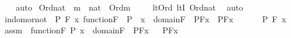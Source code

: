\begin{isabellebody}
%
\isadelimproof
\ \ %
\endisadelimproof
%
\isatagproof
{}\isamarkupfalse%
\ auto%
\endisatagproof
{\isafoldproof}%
%
\isadelimproof
\isanewline
%
\endisadelimproof
\isanewline
{}\isamarkupfalse%
\ Ord{\isacharunderscore}{\kern0pt}nat{\isacharprime}{\kern0pt}\ {\isacharcolon}{\kern0pt}\ {\isachardoublequoteopen}m\ {\isasymin}\ nat\ {\isasymLongrightarrow}\ Ord{\isacharparenleft}{\kern0pt}m{\isacharparenright}{\kern0pt}{\isachardoublequoteclose}\ \isanewline
%
\isadelimproof
\ \ %
\endisadelimproof
%
\isatagproof
{}\isamarkupfalse%
\ lt{\isacharunderscore}{\kern0pt}Ord\ ltI\ Ord{\isacharunderscore}{\kern0pt}nat\ \isamarkupfalse%
\ auto%
\endisatagproof
{\isafoldproof}%
%
\isadelimproof
\isanewline
%
\endisadelimproof
\isanewline
{}\isamarkupfalse%
\ in{\isacharunderscore}{\kern0pt}dom{\isacharunderscore}{\kern0pt}or{\isacharunderscore}{\kern0pt}not\ {\isacharcolon}{\kern0pt}\ {\isachardoublequoteopen}{\isasymAnd}P\ F\ x{\isachardot}{\kern0pt}\ function{\isacharparenleft}{\kern0pt}F{\isacharparenright}{\kern0pt}\ {\isasymLongrightarrow}\ P{\isacharparenleft}{\kern0pt}{}{\isacharparenright}{\kern0pt}\ {\isasymLongrightarrow}\ {\isacharparenleft}{\kern0pt}x\ {\isasymin}\ domain{\isacharparenleft}{\kern0pt}F{\isacharparenright}{\kern0pt}\ {\isasymLongrightarrow}\ P{\isacharparenleft}{\kern0pt}F{\isacharbackquote}{\kern0pt}x{\isacharparenright}{\kern0pt}{\isacharparenright}{\kern0pt}\ {\isasymLongrightarrow}\ P{\isacharparenleft}{\kern0pt}F{\isacharbackquote}{\kern0pt}x{\isacharparenright}{\kern0pt}{\isachardoublequoteclose}\ \isanewline
%
\isadelimproof
%
\endisadelimproof
%
\isatagproof
{}\isamarkupfalse%
\ {\isacharminus}{\kern0pt}\ \isanewline
\ \isamarkupfalse%
\ P\ F\ x\ \isanewline
\ \isamarkupfalse%
\ assm\ {\isacharcolon}{\kern0pt}\ {\isachardoublequoteopen}function{\isacharparenleft}{\kern0pt}F{\isacharparenright}{\kern0pt}{\isachardoublequoteclose}\ {\isachardoublequoteopen}P{\isacharparenleft}{\kern0pt}{}{\isacharparenright}{\kern0pt}{\isachardoublequoteclose}\ {\isachardoublequoteopen}{\isacharparenleft}{\kern0pt}x\ {\isasymin}\ domain{\isacharparenleft}{\kern0pt}F{\isacharparenright}{\kern0pt}\ {\isasymLongrightarrow}\ P{\isacharparenleft}{\kern0pt}F{\isacharbackquote}{\kern0pt}x{\isacharparenright}{\kern0pt}{\isacharparenright}{\kern0pt}{\isachardoublequoteclose}\isanewline
\ \isamarkupfalse%
\ {\isachardoublequoteopen}P{\isacharparenleft}{\kern0pt}F{\isacharbackquote}{\kern0pt}x{\isacharparenright}{\kern0pt}{\isachardoublequoteclose}\ \isanewline

\end{isabellebody}
